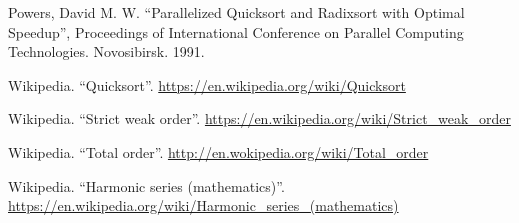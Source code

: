 \documentclass[b5paper]{article}
\begin{document}
\begin{thebibliography}{99}
Powers, David M. W. ``Parallelized Quicksort and Radixsort with Optimal Speedup'', Proceedings of International Conference on Parallel Computing Technologies. Novosibirsk. 1991.

Wikipedia. ``Quicksort''. \url{https://en.wikipedia.org/wiki/Quicksort}

Wikipedia. ``Strict weak order''. \url{https://en.wikipedia.org/wiki/Strict_weak_order}

Wikipedia. ``Total order''. \url{http://en.wokipedia.org/wiki/Total_order}

Wikipedia. ``Harmonic series (mathematics)''. \url{https://en.wikipedia.org/wiki/Harmonic_series_(mathematics)}

\end{thebibliography}

\expandafter\enddocument
\fi
\end{document}
